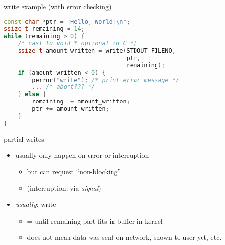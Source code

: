 
\begin{frame}[fragile,label=writeExampleErrorChecking]{write example (with error checking)}
\begin{lstlisting}[language=C++,style=small,morekeywords=ssize\_t]
const char *ptr = "Hello, World!\n";
ssize_t remaining = 14;
while (remaining > 0) {
    /* cast to void * optional in C */
    ssize_t amount_written = write(STDOUT_FILENO,
                                   ptr,
                                   remaining);
    if (amount_written < 0) {
        perror("write"); /* print error message */
        ... /* abort??? */
    } else {
        remaining -= amount_written;
        ptr += amount_written;
    }
}
\end{lstlisting}
\end{frame}

\begin{frame}{partial writes}
\begin{itemize}
    \item usually only happen on error or interruption
        \begin{itemize}
        \item but can request ``non-blocking''
        \item (interruption: via \textit{signal})
        \end{itemize}
    \item \textit{usually}: write 
        \begin{itemize}
        \item = until remaining part fits in buffer in kernel
        \item does not mean data was sent on network, shown to user yet, etc.
        \end{itemize}
\end{itemize}
\end{frame}
